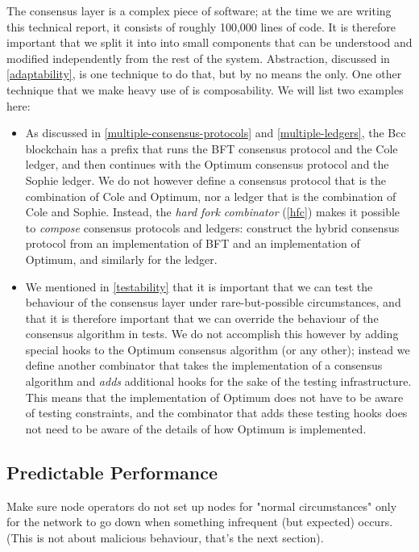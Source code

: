 The consensus layer is a complex piece of software;  at the time we are writing
this technical report, it consists of roughly 100,000 lines of code. It is
therefore important that we split it into into small components that can be
understood and modified independently from the rest of the system. Abstraction,
discussed in \cref{adaptability}, is one technique to do that, but by no means
the only. One other technique that we make heavy use of is composability. We
will list two examples here:

\begin{itemize}
\item As discussed in \cref{multiple-consensus-protocols} and
\cref{multiple-ledgers}, the Bcc blockchain has a prefix that runs the BFT
consensus protocol and the Cole ledger, and then continues with the Optimum
consensus protocol and the Sophie ledger. We do not however define a consensus
protocol that is the combination of Cole and Optimum, nor a ledger that is the
combination of Cole and Sophie. Instead, the \emph{hard fork combinator}
(\cref{hfc}) makes it possible to \emph{compose} consensus protocols and
ledgers: construct the hybrid consensus protocol from an implementation of BFT
and an implementation of Optimum, and similarly for the ledger.

\item We mentioned in \cref{testability} that it is important that we can
test the behaviour of the consensus layer under rare-but-possible circumstances,
and that it is therefore important that we can override the behaviour of the
consensus algorithm in tests. We do not accomplish this however by adding
special hooks to the Optimum consensus algorithm (or any other); instead we define
another combinator that takes the implementation of a consensus algorithm and
\emph{adds} additional hooks for the sake of the testing infrastructure. This
means that the implementation of Optimum does not have to be aware of testing
constraints, and the combinator that adds these testing hooks does not need to
be aware of the details of how Optimum is implemented.
\end{itemize}

\subsection{Predictable Performance}

Make sure node operators do not set up nodes for "normal circumstances" only
for the network to go down when something infrequent (but expected) occurs.
(This is not about malicious behaviour, that's the next section).

